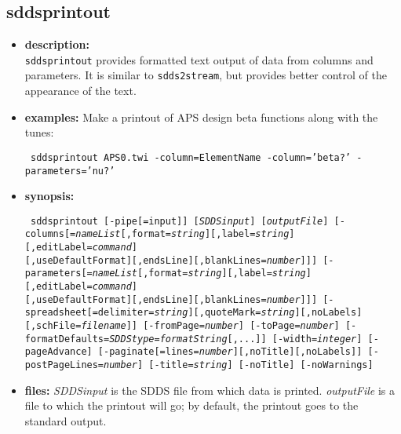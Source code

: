 \newpage
\subsection{sddsprintout}
\label{sddsprintout}

\begin{itemize}
\item {\bf description:} \hspace*{1mm}\\
{\tt sddsprintout} provides formatted text output of data from columns and parameters.  It is similar to 
{\tt sdds2stream}, but provides better control of the appearance of the text.

\item {\bf examples:}
Make a printout of APS design beta functions along with the tunes:
\begin{flushleft}{\tt
sddsprintout APS0.twi -column=ElementName -column='beta?' -parameters='nu?' 
}\end{flushleft}

\item {\bf synopsis:} 
\begin{flushleft}{\tt
sddsprintout [-pipe[=input]] [{\em SDDSinput}] [{\em outputFile}] 
[-columns[={\em nameList}[,format={\em string}][,label={\em string}][,editLabel={\em command}]\\
 \hspace*{5mm} [,useDefaultFormat][,endsLine][,blankLines={\em number}]]]
[-parameters[={\em nameList}[,format={\em string}][,label={\em string}][,editLabel={\em command}] \\
 \hspace*{5mm} [,useDefaultFormat][,endsLine][,blankLines={\em number}]]]
[-spreadsheet[=delimiter={\em string}][,quoteMark={\em string}][,noLabels][,schFile={\em filename}]]
[-fromPage={\em number}] [-toPage={\em number}] 
[-formatDefaults={\em SDDStype}={\em formatString}[,...]]
[-width={\em integer}] [-pageAdvance] [-paginate[=lines={\em number}][,noTitle][,noLabels]]
[-postPageLines={\em number}] [-title={\em string}] [-noTitle] [-noWarnings]

}\end{flushleft}
\item {\bf files:}
{\em SDDSinput} is the SDDS file from which data is printed.  {\em outputFile} is a file to which the
printout will go; by default, the printout goes to the standard output.


\end{itemize}
